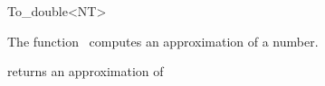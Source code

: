 \begin{ccRefFunctionObjectClass}{To_double<NT>}

\ccDefinition

The function \ccRefName\ computes an approximation of a number.


\ccIsModel
{}

{returns an approximation of }

\end{ccRefFunctionObjectClass}
